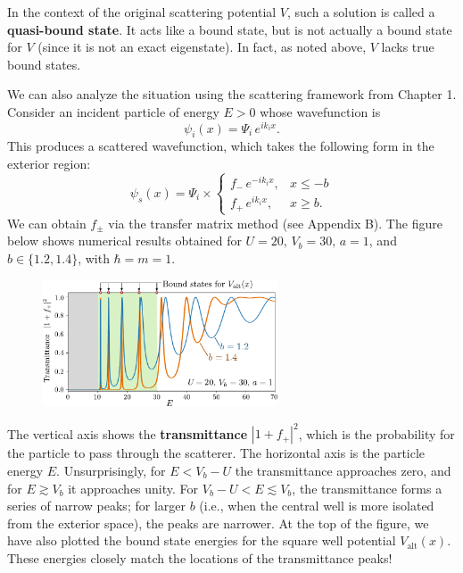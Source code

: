 \documentclass[prx,12pt]{revtex4-2}
\begin{document}
In the context of the original scattering potential $V$, such a
solution is called a \textbf{quasi-bound state}.  It acts like a bound
state, but is not actually a bound state for $V$ (since it is not an
exact eigenstate).  In fact, as noted above, $V$ lacks true bound
states.

We can also analyze the situation using the scattering framework from
Chapter 1.  Consider an incident particle of energy $E > 0$ whose
wavefunction is
\begin{equation}
  \psi_i(x) = \Psi_i \, e^{ik_i x}.
\end{equation}
This produces a scattered wavefunction, which takes the following form
in the exterior region:
\begin{equation}
  \psi_s(x) = \Psi_i \times \begin{cases}f_- \,e^{-ik_ix}, & x \le -b \\ f_+ \,e^{ik_ix}, & x \ge b.\end{cases}
\end{equation}
We can obtain $f_\pm$ via the transfer matrix method (see Appendix B).
The figure below shows numerical results obtained for $U = 20,\,V_b =
30,\,a=1$, and $b \in \{ 1.2, 1.4\}$, with $\hbar = m = 1$.

\begin{figure}[h]
  \centering\includegraphics[width=0.62\textwidth]{resonances}
\end{figure}

The vertical axis shows the \textbf{transmittance} $|1+f_+|^2$, which
is the probability for the particle to pass through the scatterer.
The horizontal axis is the particle energy $E$.  Unsurprisingly, for
$E < V_b-U$ the transmittance approaches zero, and for $E \gtrsim V_b$
it approaches unity.  For $V_b-U < E \lesssim V_b$, the transmittance
forms a series of narrow peaks; for larger $b$ (i.e., when the central
well is more isolated from the exterior space), the peaks are
narrower.  At the top of the figure, we have also plotted the bound
state energies for the square well potential $V_{\mathrm{alt}}(x)$.
These energies closely match the locations of the transmittance peaks!
\end{document}
